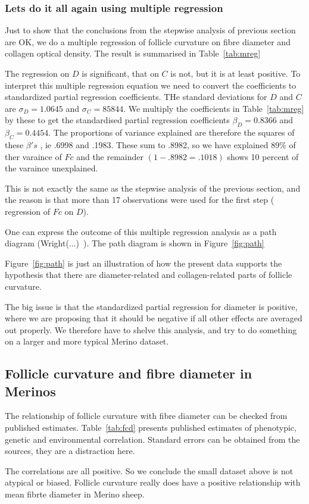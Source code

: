 \documentclass{article}
\begin{document}
\begin{tiny}
\subsubsection{ Lets do it all again using multiple regression}
Just to show that the conclusions from the stepwise analysis of previous section are OK, we do a multiple regression of follicle curvature  on fibre diameter and collagen optical density. The result is summarised in Table~\ref{tab:mreg}

The regression on $D$ is significant, that on $C$ is not, but it is at least positive. To interpret this multiple regression equation we need to convert the coefficients to standardized partial regression coefficients. THe standard deviations for $D$ and $C$ are $\sigma_{D} = 1.0645$ and $\sigma_{C} = 85844$. We multiply the coefficients in Table~\ref{tab:mreg} by these to get the standardised partial regression coefficients $\beta_{D} = 0.8366$ and $\beta_{C} = 0.4454$. The proportions of variance explained are therefore the squares of these $\beta's$ , ie .6998 and .1983. These sum to .8982, so we have explained 89\% of ther varaince of $Fc$ and the remainder $(1-.8982 = .1018)$ shows 10 percent of the varaince unexplained.

This is not exactly the same as the stepwise analysis of the previous section, and the reason is that more than 17 observations were used for the first step ( regression of $Fc$ on $D$). 

One can express the outcome of this multiple regression analysis as a path diagram (Wright(...)~\cite{wright-}). The path diagram is shown in Figure~\ref{fig:path}

Figure~\ref{fig:path} is just an illustration of how the present data supports the hypothesis that there are diameter-related and collagen-related parts of follicle curvature. 

The big issue is that the standardized partial regression for diameter is positive, where we are proposing that it should be negative if all other effects are averaged out properly.  We therefore have to shelve this analysis, and try to do something on a larger and more typical Merino dataset.

\end{tiny}

\subsection{Follicle curvature and fibre diameter in Merinos}
\label{sec:pubcor}
The relationship of follicle curvature with fibre diameter can be checked from published estimates. Table~\ref{tab:fcd} presents published estimates of phenotypic, genetic and environmental correlation. Standard errors can be obtained from the sources, they are a distraction here.

The correlations are all positive. So we conclude the small dataset above is not atypical or biased. Follicle curvature really does have a positive relationship with mean fibrte diameter in Merino sheep.
\end{document}
